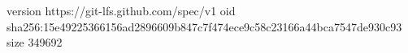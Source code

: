 version https://git-lfs.github.com/spec/v1
oid sha256:15e49225366156ad2896609b847c7f474ece9c58c23166a44bca7547de930c93
size 349692
